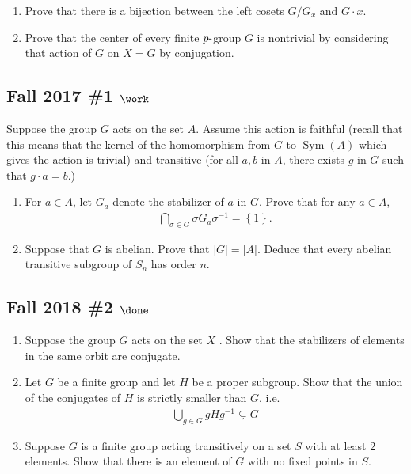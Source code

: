 \begin{enumerate}
\def\labelenumi{\alph{enumi}.}
\item
  Prove that there is a bijection between the left cosets \(G/G_x\) and
  \(G\cdot x\).
\item
  Prove that the center of every finite \(p{\hbox{-}}\)group \(G\) is
  nontrivial by considering that action of \(G\) on \(X=G\) by
  conjugation.
\end{enumerate}

\hypertarget{fall-2017-1-work}{%
\subsection{\texorpdfstring{Fall 2017 \#1
\(\work\)}{Fall 2017 \#1 \textbackslash work}}\label{fall-2017-1-work}}

Suppose the group \(G\) acts on the set \(A\). Assume this action is
faithful (recall that this means that the kernel of the homomorphism
from \(G\) to \(\operatorname{Sym}(A)\) which gives the action is
trivial) and transitive (for all \(a, b\) in \(A\), there exists \(g\)
in \(G\) such that \(g \cdot a = b\).)

\begin{enumerate}
\def\labelenumi{\alph{enumi}.}
\item
  For \(a \in A\), let \(G_a\) denote the stabilizer of \(a\) in \(G\).
  Prove that for any \(a \in A\),
  \begin{align*}
  \bigcap_{\sigma\in G} \sigma G_a \sigma^{-1}= \left\{{1}\right\}
  .\end{align*}
\item
  Suppose that \(G\) is abelian. Prove that \(|G| = |A|\). Deduce that
  every abelian transitive subgroup of \(S_n\) has order \(n\).
\end{enumerate}

\hypertarget{fall-2018-2-done}{%
\subsection{\texorpdfstring{Fall 2018 \#2
\(\done\)}{Fall 2018 \#2 \textbackslash done}}\label{fall-2018-2-done}}

\begin{enumerate}
\def\labelenumi{\alph{enumi}.}
\item
  Suppose the group \(G\) acts on the set \(X\) . Show that the
  stabilizers of elements in the same orbit are conjugate.
\item
  Let \(G\) be a finite group and let \(H\) be a proper subgroup. Show
  that the union of the conjugates of \(H\) is strictly smaller than
  \(G\), i.e.
  \begin{align*}
  \bigcup_{g\in G} gHg^{-1}\subsetneq G
  \end{align*}
\item
  Suppose \(G\) is a finite group acting transitively on a set \(S\)
  with at least 2 elements. Show that there is an element of \(G\) with
  no fixed points in \(S\).
\end{enumerate}

